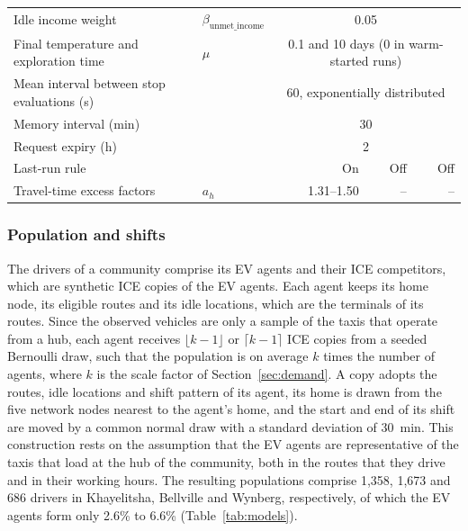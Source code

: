 \begin{table}[htbp]
\begin{tabularx}{\linewidth}{@{}Xlrrr@{}}
        Idle income weight & $\beta_{\text{unmet\_income}}$ & \multicolumn{3}{c}{0.05} \\
        Final temperature and exploration time & $\mu$ &\multicolumn{3}{c}{0.1 and 10 days (0 in warm-started runs)} \\
        Mean interval between stop evaluations (s) & & \multicolumn{3}{c}{60, exponentially distributed} \\
        Memory interval (min) & & \multicolumn{3}{c}{30} \\
        Request expiry (h) & & \multicolumn{3}{c}{2} \\
        Last-run rule & & On & Off & Off \\
        Travel-time excess factors & $a_h$ & 1.31--1.50 & -- & -- \\
        \bottomrule
    \end{tabularx}
\end{table}

\subsubsection{Population and shifts}
\label{app:abm_population}

The drivers of a community comprise its EV agents and their ICE competitors, which are synthetic ICE copies of the EV agents. Each agent keeps its home node, its eligible routes and its idle locations, which are the terminals of its routes. Since the observed vehicles are only a sample of the taxis that operate from a hub, each agent receives \( \lfloor k - 1 \rfloor \) or \( \lceil k - 1 \rceil \) ICE copies from a seeded Bernoulli draw, such that the population is on average \( k \) times the number of agents, where \( k \) is the scale factor of Section~\ref{sec:demand}. A copy adopts the routes, idle locations and shift pattern of its agent, its home is drawn from the five network nodes nearest to the agent's home, and the start and end of its shift are moved by a common normal draw with a standard deviation of 30~min. This construction rests on the assumption that the EV agents are representative of the taxis that load at the hub of the community, both in the routes that they drive and in their working hours. The resulting populations comprise 1{,}358, 1{,}673 and 686 drivers in Khayelitsha, Bellville and Wynberg, respectively, of which the EV agents form only 2.6\% to 6.6\% (Table~\ref{tab:models}).

